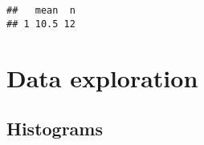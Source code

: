 \begin{verbatim}
##   mean  n
## 1 10.5 12
\end{verbatim}

\hypertarget{data-exploration}{%
\section{Data exploration}\label{data-exploration}}

\hypertarget{histograms}{%
\subsection{Histograms}\label{histograms}}

\begin{Shaded}
\begin{Highlighting}[]
\StringTok{ }\OperatorTok{$}
\NormalTok{(}\NormalTok{(}\NormalTok{(}
\end{Highlighting}
\end{Shaded}
